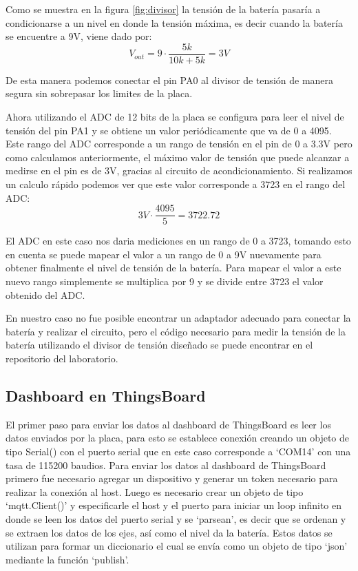 Como se muestra en la figura \ref{fig:divisor} la tensión de la batería pasaría a condicionarse a un nivel en donde la tensión máxima, es decir cuando la batería se encuentre a 9V, viene dado por:
\begin{equation}
    V_{out} = 9 \cdot \frac{5k}{10k+5k} = 3V
\end{equation}

De esta manera podemos conectar el pin PA0 al divisor de tensión de manera segura sin sobrepasar los limites de la placa. 

Ahora utilizando el ADC de 12 bits de la placa se configura para leer el nivel de tensión del pin PA1 y se obtiene un valor periódicamente que va de 0 a 4095. Este rango del ADC corresponde a un rango de tensión en el pin de 0 a 3.3V pero como calculamos anteriormente, el máximo valor de tensión que puede alcanzar a medirse en el pin es de 3V, gracias al circuito de acondicionamiento. Si realizamos un calculo rápido podemos ver que este valor corresponde a 3723 en el rango del ADC:
\begin{equation}
    3V \cdot \frac{4095}{5} = 3722.72
\end{equation}

El ADC en este caso nos daria mediciones en un rango 
de 0 a 3723, tomando esto en cuenta se puede mapear el valor a un rango de 0 a 9V nuevamente para obtener finalmente el nivel de tensión de la batería. Para mapear el valor a este nuevo rango simplemente se multiplica por 9 y se divide entre 3723 el valor obtenido del ADC.

En nuestro caso no fue posible encontrar un adaptador adecuado para conectar la batería y realizar el circuito, pero el código necesario para medir la tensión de la batería utilizando el divisor de tensión diseñado se puede encontrar en el repositorio del laboratorio. 

\subsection{Dashboard en ThingsBoard}
El primer paso para enviar los datos al dashboard de ThingsBoard es leer los datos enviados por la placa, para esto se establece conexión creando un objeto de tipo Serial() con el puerto serial que en este caso corresponde a ‘COM14’ con una tasa de 115200 baudios. 
Para enviar los datos al dashboard de ThingsBoard primero fue necesario agregar un dispositivo y generar un token necesario para realizar la conexión al host. Luego es necesario crear un objeto de tipo ‘mqtt.Client()’ y especificarle el host y el puerto para iniciar un loop infinito en donde se leen los datos del puerto serial y se ‘parsean’, es decir que se ordenan y se extraen los datos de los ejes, así como el nivel da la batería. Estos datos se utilizan para formar un diccionario el cual se envía como un objeto de tipo ‘json’ mediante la función ‘publish’.


